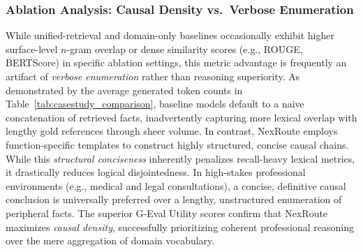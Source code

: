 \documentclass[a4paper,fleql]{cas-sc}
\begin{document}
\subsubsection{Ablation Analysis: Causal Density vs.\ Verbose Enumeration}
\label{sssec:causal-density}
While unified-retrieval and domain-only baselines occasionally exhibit higher
surface-level $n$-gram overlap or dense similarity scores (e.g., ROUGE,
BERTScore) in specific ablation settings, this metric advantage is frequently
an artifact of \textit{verbose enumeration} rather than reasoning superiority.
As demonstrated by the average generated token counts in
Table~\ref{tab:casestudy_comparison}, baseline models default to a naive
concatenation of retrieved facts, inadvertently capturing more lexical overlap
with lengthy gold references through sheer volume. In contrast, NexRoute
employs function-specific templates to construct highly structured, concise
causal chains. While this \textit{structural conciseness} inherently penalizes
recall-heavy lexical metrics, it drastically reduces logical disjointedness.
In high-stakes professional environments (e.g., medical and legal
consultations), a concise, definitive causal conclusion is universally
preferred over a lengthy, unstructured enumeration of peripheral facts. The
superior G-Eval Utility scores confirm that NexRoute maximizes \textit{causal
density}, successfully prioritizing coherent professional reasoning over the
mere aggregation of domain vocabulary.

\end{document}
